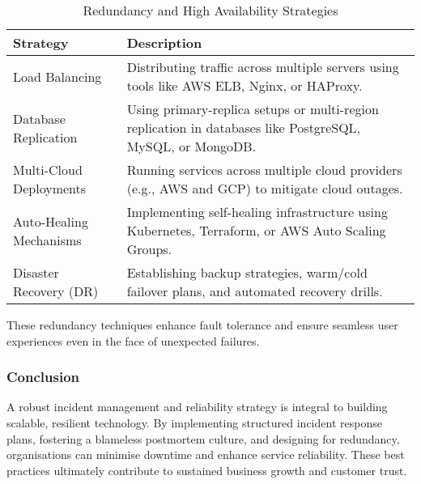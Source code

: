 \begin{table}[h]
    \centering
    \begin{tabular}{|l|p{10cm}|}
        \hline
        \textbf{Strategy}       & \textbf{Description}                                                                                      \\
        \hline
        Load Balancing          & Distributing traffic across multiple servers using tools like AWS ELB, Nginx, or HAProxy.                 \\
        \hline
        Database Replication    & Using primary-replica setups or multi-region replication in databases like PostgreSQL, MySQL, or MongoDB. \\
        \hline
        Multi-Cloud Deployments & Running services across multiple cloud providers (e.g., AWS and GCP) to mitigate cloud outages.           \\
        \hline
        Auto-Healing Mechanisms & Implementing self-healing infrastructure using Kubernetes, Terraform, or AWS Auto Scaling Groups.         \\
        \hline
        Disaster Recovery (DR)  & Establishing backup strategies, warm/cold failover plans, and automated recovery drills.                  \\
        \hline
    \end{tabular}
    \caption{Redundancy and High Availability Strategies}
    \label{tab:redundancy-strategies}
\end{table}

These redundancy techniques enhance fault tolerance and ensure seamless user experiences even in the face of unexpected failures.

\subsubsection{Conclusion}

A robust incident management and reliability strategy is integral to building scalable, resilient technology. By implementing structured incident response plans, fostering a blameless postmortem culture, and designing for redundancy, organisations can minimise downtime and enhance service reliability. These best practices ultimately contribute to sustained business growth and customer trust.

